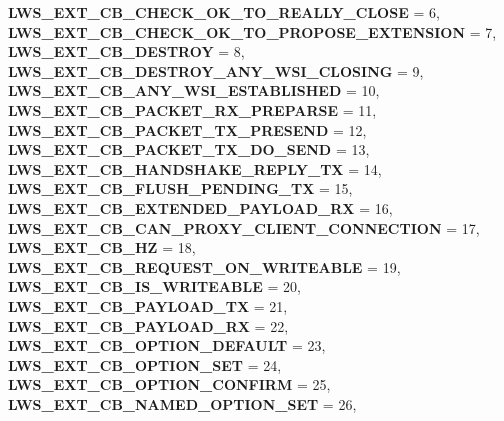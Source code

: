\begin{DoxyCompactItemize}
\newline
{\bfseries L\+W\+S\+\_\+\+E\+X\+T\+\_\+\+C\+B\+\_\+\+C\+H\+E\+C\+K\+\_\+\+O\+K\+\_\+\+T\+O\+\_\+\+R\+E\+A\+L\+L\+Y\+\_\+\+C\+L\+O\+SE} = 6, 
{\bfseries L\+W\+S\+\_\+\+E\+X\+T\+\_\+\+C\+B\+\_\+\+C\+H\+E\+C\+K\+\_\+\+O\+K\+\_\+\+T\+O\+\_\+\+P\+R\+O\+P\+O\+S\+E\+\_\+\+E\+X\+T\+E\+N\+S\+I\+ON} = 7, 
{\bfseries L\+W\+S\+\_\+\+E\+X\+T\+\_\+\+C\+B\+\_\+\+D\+E\+S\+T\+R\+OY} = 8, 
{\bfseries L\+W\+S\+\_\+\+E\+X\+T\+\_\+\+C\+B\+\_\+\+D\+E\+S\+T\+R\+O\+Y\+\_\+\+A\+N\+Y\+\_\+\+W\+S\+I\+\_\+\+C\+L\+O\+S\+I\+NG} = 9, 
\newline
{\bfseries L\+W\+S\+\_\+\+E\+X\+T\+\_\+\+C\+B\+\_\+\+A\+N\+Y\+\_\+\+W\+S\+I\+\_\+\+E\+S\+T\+A\+B\+L\+I\+S\+H\+ED} = 10, 
{\bfseries L\+W\+S\+\_\+\+E\+X\+T\+\_\+\+C\+B\+\_\+\+P\+A\+C\+K\+E\+T\+\_\+\+R\+X\+\_\+\+P\+R\+E\+P\+A\+R\+SE} = 11, 
{\bfseries L\+W\+S\+\_\+\+E\+X\+T\+\_\+\+C\+B\+\_\+\+P\+A\+C\+K\+E\+T\+\_\+\+T\+X\+\_\+\+P\+R\+E\+S\+E\+ND} = 12, 
{\bfseries L\+W\+S\+\_\+\+E\+X\+T\+\_\+\+C\+B\+\_\+\+P\+A\+C\+K\+E\+T\+\_\+\+T\+X\+\_\+\+D\+O\+\_\+\+S\+E\+ND} = 13, 
\newline
{\bfseries L\+W\+S\+\_\+\+E\+X\+T\+\_\+\+C\+B\+\_\+\+H\+A\+N\+D\+S\+H\+A\+K\+E\+\_\+\+R\+E\+P\+L\+Y\+\_\+\+TX} = 14, 
{\bfseries L\+W\+S\+\_\+\+E\+X\+T\+\_\+\+C\+B\+\_\+\+F\+L\+U\+S\+H\+\_\+\+P\+E\+N\+D\+I\+N\+G\+\_\+\+TX} = 15, 
{\bfseries L\+W\+S\+\_\+\+E\+X\+T\+\_\+\+C\+B\+\_\+\+E\+X\+T\+E\+N\+D\+E\+D\+\_\+\+P\+A\+Y\+L\+O\+A\+D\+\_\+\+RX} = 16, 
{\bfseries L\+W\+S\+\_\+\+E\+X\+T\+\_\+\+C\+B\+\_\+\+C\+A\+N\+\_\+\+P\+R\+O\+X\+Y\+\_\+\+C\+L\+I\+E\+N\+T\+\_\+\+C\+O\+N\+N\+E\+C\+T\+I\+ON} = 17, 
\newline
{\bfseries L\+W\+S\+\_\+\+E\+X\+T\+\_\+\+C\+B\+\_\+HZ} = 18, 
{\bfseries L\+W\+S\+\_\+\+E\+X\+T\+\_\+\+C\+B\+\_\+\+R\+E\+Q\+U\+E\+S\+T\+\_\+\+O\+N\+\_\+\+W\+R\+I\+T\+E\+A\+B\+LE} = 19, 
{\bfseries L\+W\+S\+\_\+\+E\+X\+T\+\_\+\+C\+B\+\_\+\+I\+S\+\_\+\+W\+R\+I\+T\+E\+A\+B\+LE} = 20, 
{\bfseries L\+W\+S\+\_\+\+E\+X\+T\+\_\+\+C\+B\+\_\+\+P\+A\+Y\+L\+O\+A\+D\+\_\+\+TX} = 21, 
\newline
{\bfseries L\+W\+S\+\_\+\+E\+X\+T\+\_\+\+C\+B\+\_\+\+P\+A\+Y\+L\+O\+A\+D\+\_\+\+RX} = 22, 
{\bfseries L\+W\+S\+\_\+\+E\+X\+T\+\_\+\+C\+B\+\_\+\+O\+P\+T\+I\+O\+N\+\_\+\+D\+E\+F\+A\+U\+LT} = 23, 
{\bfseries L\+W\+S\+\_\+\+E\+X\+T\+\_\+\+C\+B\+\_\+\+O\+P\+T\+I\+O\+N\+\_\+\+S\+ET} = 24, 
{\bfseries L\+W\+S\+\_\+\+E\+X\+T\+\_\+\+C\+B\+\_\+\+O\+P\+T\+I\+O\+N\+\_\+\+C\+O\+N\+F\+I\+RM} = 25, 
\newline
{\bfseries L\+W\+S\+\_\+\+E\+X\+T\+\_\+\+C\+B\+\_\+\+N\+A\+M\+E\+D\+\_\+\+O\+P\+T\+I\+O\+N\+\_\+\+S\+ET} = 26, 

\end{DoxyCompactItemize}

